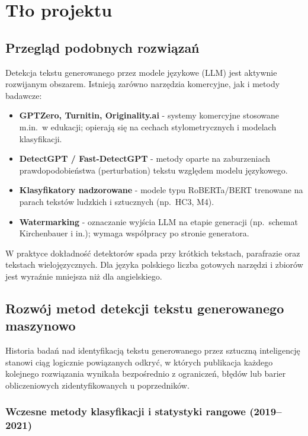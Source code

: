 \section{Tło projektu}

\subsection{Przegląd podobnych rozwiązań}

Detekcja tekstu generowanego przez modele językowe (LLM) jest aktywnie rozwijanym obszarem. Istnieją zarówno narzędzia komercyjne, jak i metody badawcze:

\begin{itemize}
	\item \textbf{GPTZero, Turnitin, Originality.ai} - systemy komercyjne stosowane m.in.\ w edukacji; opierają się na cechach stylometrycznych i modelach klasyfikacji.
	\item \textbf{DetectGPT / Fast-DetectGPT} - metody oparte na zaburzeniach prawdopodobieństwa (perturbation) tekstu względem modelu językowego.
	\item \textbf{Klasyfikatory nadzorowane} - modele typu RoBERTa/BERT trenowane na parach tekstów ludzkich i sztucznych (np.\ HC3, M4).
	\item \textbf{Watermarking} - oznaczanie wyjścia LLM na etapie generacji (np.\ schemat Kirchenbauer i in.); wymaga współpracy po stronie generatora.
\end{itemize}

W praktyce dokładność detektorów spada przy krótkich tekstach, parafrazie oraz tekstach wielojęzycznych. Dla języka polskiego liczba gotowych narzędzi i zbiorów jest wyraźnie mniejsza niż dla angielskiego.

\subsection{Rozwój metod detekcji tekstu generowanego maszynowo}

Historia badań nad identyfikacją tekstu generowanego przez sztuczną inteligencję stanowi ciąg logicznie powiązanych odkryć, w których publikacja każdego kolejnego rozwiązania wynikała bezpośrednio z ograniczeń, błędów lub barier obliczeniowych zidentyfikowanych u poprzedników.

\subsubsection{Wczesne metody klasyfikacji i statystyki rangowe (2019--2021)}

